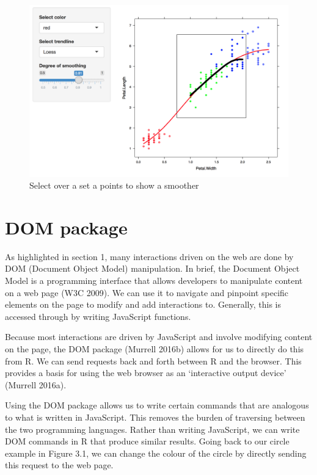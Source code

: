 \documentclass[11pt,]{report}
\begin{document}
\begin{figure}[H]

{\centering \includegraphics[width=0.7\linewidth,]{./fig/tl-shiny-2} 

}

\caption{\label{fig:tl-shiny-2} Select over a set a points to show a smoother}\label{fig:unnamed-chunk-38}
\end{figure}

\section{DOM package}\label{dom-package}

As highlighted in section 1, many interactions driven on the web are
done by \textsf{DOM} (Document Object Model) manipulation. In brief, the
Document Object Model is a programming interface that allows developers
to manipulate content on a web page (W3C 2009). We can use it to
navigate and pinpoint specific elements on the page to modify and add
interactions to. Generally, this is accessed through by writing
JavaScript functions.

Because most interactions are driven by JavaScript and involve modifying
content on the page, the \textsf{DOM} package (Murrell 2016b) allows for
us to directly do this from R. We can send requests back and forth
between R and the browser. This provides a basis for using the web
browser as an `interactive output device' (Murrell 2016a).

Using the \textsf{DOM} package allows us to write certain commands that
are analogous to what is written in JavaScript. This removes the burden
of traversing between the two programming languages. Rather than writing
JavaScript, we can write \textsf{DOM} commands in R that produce similar
results. Going back to our circle example in Figure 3.1, we can change
the colour of the circle by directly sending this request to the web
page.
\end{document}
